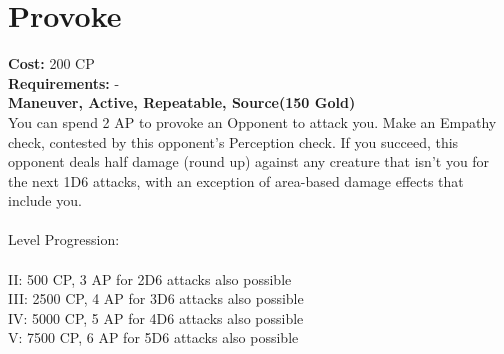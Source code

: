 \section{Provoke}
\textbf{Cost:} 200 CP\\
\textbf{Requirements:} -\\
\textbf{Maneuver, Active, Repeatable, Source(150 Gold)}\\
You can spend 2 AP to provoke an Opponent to attack you. Make an Empathy check, contested by this opponent’s Perception check. If you succeed, this opponent deals half damage (round up) against any creature that isn’t you for the next 1D6 attacks, with an exception of area-based damage effects that include you.\\
\\
Level Progression:\\
\\
II: 500 CP, 3 AP for 2D6 attacks also possible\\
III: 2500 CP, 4 AP for 3D6 attacks also possible\\
IV: 5000 CP, 5 AP for 4D6 attacks also possible\\
V: 7500 CP, 6 AP for 5D6 attacks also possible\\